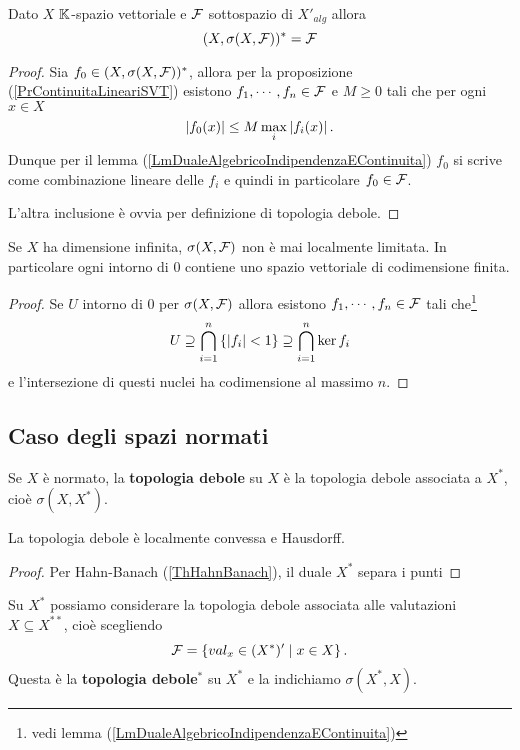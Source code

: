 \begin{proposition}\label{PrDualePerTopologiaDebole}
Dato $X$ $\mathbb{K}$-spazio vettoriale e $\mathcal{F}$ sottospazio di $X'_{alg}$ allora
\[(X,\sigma(X,\mathcal{F}))^\ast=\mathcal{F}\]
\end{proposition}
\begin{proof}
Sia $f_0\in (X,\sigma(X,\mathcal{F}))^\ast$, allora per la proposizione (\ref{PrContinuitaLineariSVT}) esistono $f_1,\cdots, f_n\in\mathcal{F}$ e $M\geq0$ tali che per ogni $x\in X$
\[\left|{f_0(x)}\right|\leq M\max_{i}\left|{f_i(x)}\right|.\]
Dunque per il lemma (\ref{LmDualeAlgebricoIndipendenzaEContinuita}) $f_0$ si scrive come combinazione lineare delle $f_i$ e quindi in particolare $f_0\in\mathcal{F}$.

L'altra inclusione \`e ovvia per definizione di topologia debole.
\end{proof}

\begin{remark}
Se $X$ ha dimensione infinita, $\sigma(X,\mathcal{F})$ non \`e mai localmente limitata. In particolare ogni intorno di $0$ contiene uno spazio vettoriale di codimensione finita.
\end{remark}
\begin{proof}
Se $U$ intorno di $0$ per $\sigma(X,\mathcal{F})$ allora esistono $f_1,\cdots,f_n\in\mathcal{F}$ tali che\footnote{vedi lemma (\ref{LmDualeAlgebricoIndipendenzaEContinuita})}
\[U\supseteq \bigcap_{i=1}^n\left\{{\left|{f_i}\right|<1}\right\}\supseteq \bigcap_{i=1}^n \ker f_i\]
e l'intersezione di questi nuclei ha codimensione al massimo $n$.
\end{proof}

\subsection{Caso degli spazi normati}

\begin{definition}
Se $X$ \`e normato, la \textbf{topologia debole} su $X$ \`e la topologia debole associata a $X^\ast$, cio\`e $\sigma(X,X^\ast)$.
\end{definition}

\begin{proposition}
La topologia debole \`e localmente convessa e Hausdorff.
\end{proposition}
\begin{proof}
Per Hahn-Banach (\ref{ThHahnBanach}), il duale $X^\ast$ separa i punti
\end{proof}


\begin{definition}
Su $X^\ast$ possiamo considerare la topologia debole associata alle valutazioni $X\subseteq X^{\ast\ast}$, cio\`e scegliendo
\[\mathcal{F}=\left\{{val_x\in (X^\ast)'\mid x\in X}\right\}.\]
Questa \`e la \textbf{topologia debole$^\ast$} su $X^\ast$ e la indichiamo $\sigma(X^\ast,X)$.
\end{definition}


